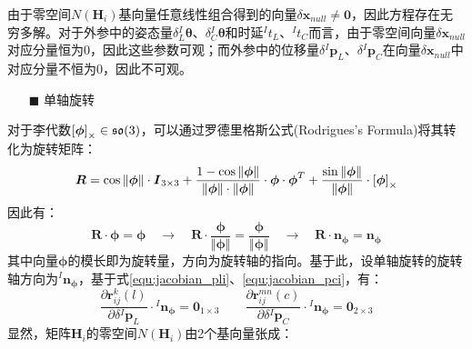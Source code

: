 由于零空间$N(\boldsymbol{H}_i)$基向量任意线性组合得到的向量$\delta\boldsymbol{x}_{null}\ne\boldsymbol{0}$，因此方程存在无穷多解。对于外参中的姿态量$\delta {^{I}_{L}\boldsymbol{\theta}}$、$\delta {^{I}_{C}\boldsymbol{\theta}}$和时延${^{I}t_{L}}$、${^{I}t_{C}}$而言，由于零空间向量$\delta\boldsymbol{x}_{null}$对应分量恒为0，因此这些参数可观；而外参中的位移量$\delta {^{I}\boldsymbol{p}_L}$、$\delta {^{I}\boldsymbol{p}_C}$在向量$\delta\boldsymbol{x}_{null}$中对应分量不恒为0，因此不可观。

\begin{itemize}
  \item[$\blacksquare$]单轴旋转
\end{itemize}

对于李代数$\left[ \boldsymbol{\phi} \right]_\times\in\mathfrak{so}(3)$，可以通过罗德里格斯公式(Rodrigues's Formula)将其转化为旋转矩阵\cite{高翔2017视觉}：
\begin{equation}
  \boldsymbol{R}=\cos\Vert\boldsymbol{\phi}\Vert\cdot\boldsymbol{I}_{3\times 3}+
  \frac{1-\cos\Vert\boldsymbol{\phi}\Vert}{\Vert\boldsymbol{\phi}\Vert\cdot\Vert\boldsymbol{\phi}\Vert}\cdot\boldsymbol{\phi}\cdot\boldsymbol{\phi}^T
  +\frac{\sin\Vert\boldsymbol{\phi}\Vert}{\Vert\boldsymbol{\phi}\Vert}\cdot\left[ \boldsymbol{\phi} \right]_\times
\end{equation}
因此有：
\begin{equation}
  \label{equ:rot_axis}
  \boldsymbol{R}\cdot\boldsymbol{\phi}=\boldsymbol{\phi}
  \quad\to\quad
  \boldsymbol{R}\cdot\frac{\boldsymbol{\phi}}{\Vert\boldsymbol{\phi}\Vert}=
  \frac{\boldsymbol{\phi}}{\Vert\boldsymbol{\phi}\Vert}
  \quad\to\quad
  \boldsymbol{R}\cdot\boldsymbol{n}_{\boldsymbol{\phi}}=\boldsymbol{n}_{\boldsymbol{\phi}}
\end{equation}
其中向量$\boldsymbol{\phi}$的模长即为旋转量，方向为旋转轴的指向。基于此，设单轴旋转的旋转轴方向为$^{I}\boldsymbol{n}_{\boldsymbol{\phi}}$，基于式\ref{equ:jacobian_pli}、\ref{equ:jacobian_pci}，有：
\begin{equation}
  \frac{\partial \boldsymbol{r}_{ij}^k(l)}{\partial \delta {^{I}\boldsymbol{p}_L}}\cdot{^{I}\boldsymbol{n}_{\boldsymbol{\phi}}}=\boldsymbol{0}_{1\times 3}
  \quad\quad
  \frac{\partial \boldsymbol{r}_{ij}^{mn}(c)}{\partial \delta {^{I}\boldsymbol{p}_C}}
  \cdot{^{I}\boldsymbol{n}_{\boldsymbol{\phi}}}=\boldsymbol{0}_{2\times 3}
\end{equation}
显然，矩阵$\boldsymbol{H}_i$的零空间$N(\boldsymbol{H}_i)$由2个基向量张成：
